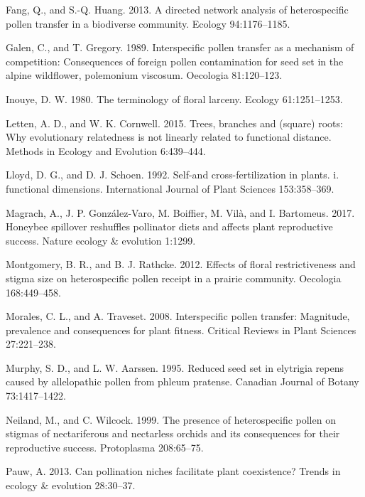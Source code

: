 \documentclass[11pt,a4paper]{article}
\begin{document}
\hypertarget{ref-fang2013}{}
Fang, Q., and S.-Q. Huang. 2013. A directed network analysis of
heterospecific pollen transfer in a biodiverse community. Ecology
94:1176--1185.

\hypertarget{ref-galen1989}{}
Galen, C., and T. Gregory. 1989. Interspecific pollen transfer as a
mechanism of competition: Consequences of foreign pollen contamination
for seed set in the alpine wildflower, polemonium viscosum. Oecologia
81:120--123.

\hypertarget{ref-inouye1980}{}
Inouye, D. W. 1980. The terminology of floral larceny. Ecology
61:1251--1253.

\hypertarget{ref-letten2015}{}
Letten, A. D., and W. K. Cornwell. 2015. Trees, branches and (square)
roots: Why evolutionary relatedness is not linearly related to
functional distance. Methods in Ecology and Evolution 6:439--444.

\hypertarget{ref-lloyd1992}{}
Lloyd, D. G., and D. J. Schoen. 1992. Self-and cross-fertilization in
plants. i. functional dimensions. International Journal of Plant
Sciences 153:358--369.

\hypertarget{ref-magrach2017}{}
Magrach, A., J. P. González-Varo, M. Boiffier, M. Vilà, and I.
Bartomeus. 2017. Honeybee spillover reshuffles pollinator diets and
affects plant reproductive success. Nature ecology \& evolution 1:1299.

\hypertarget{ref-montgomery2012}{}
Montgomery, B. R., and B. J. Rathcke. 2012. Effects of floral
restrictiveness and stigma size on heterospecific pollen receipt in a
prairie community. Oecologia 168:449--458.

\hypertarget{ref-morales2008}{}
Morales, C. L., and A. Traveset. 2008. Interspecific pollen transfer:
Magnitude, prevalence and consequences for plant fitness. Critical
Reviews in Plant Sciences 27:221--238.

\hypertarget{ref-murphy1995}{}
Murphy, S. D., and L. W. Aarssen. 1995. Reduced seed set in elytrigia
repens caused by allelopathic pollen from phleum pratense. Canadian
Journal of Botany 73:1417--1422.

\hypertarget{ref-neiland1999}{}
Neiland, M., and C. Wilcock. 1999. The presence of heterospecific pollen
on stigmas of nectariferous and nectarless orchids and its consequences
for their reproductive success. Protoplasma 208:65--75.

\hypertarget{ref-pauw2013}{}
Pauw, A. 2013. Can pollination niches facilitate plant coexistence?
Trends in ecology \& evolution 28:30--37.
\end{document}
